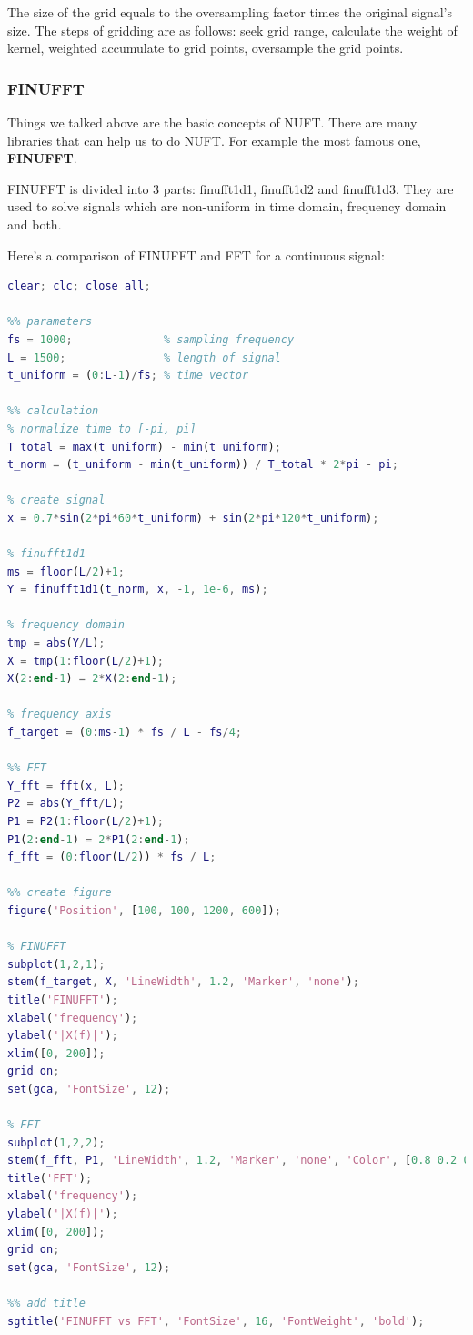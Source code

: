 \documentclass[12pt]{ctexart}
\begin{document}
The size of the grid equals to the oversampling factor times the original signal's size.
The steps of gridding are as follows: seek grid range, calculate the weight of kernel,
weighted accumulate to grid points, oversample the grid points.

\subsubsection{\textbf{FINUFFT}}

Things we talked above are the basic concepts of NUFT. There are many libraries
that can help us to do NUFT. For example the most famous one, \textbf{FINUFFT}.

FINUFFT is divided into 3 parts: finufft1d1, finufft1d2 and finufft1d3. They are
used to solve signals which are non-uniform in time domain, frequency domain and
both.

Here's a comparison of FINUFFT and FFT for a continuous signal:
\begin{lstlisting}[language=Matlab]
%% FINUFFT_example
clear; clc; close all;

%% parameters
fs = 1000;              % sampling frequency
L = 1500;               % length of signal
t_uniform = (0:L-1)/fs; % time vector

%% calculation
% normalize time to [-pi, pi]
T_total = max(t_uniform) - min(t_uniform);
t_norm = (t_uniform - min(t_uniform)) / T_total * 2*pi - pi;

% create signal
x = 0.7*sin(2*pi*60*t_uniform) + sin(2*pi*120*t_uniform);

% finufft1d1
ms = floor(L/2)+1;
Y = finufft1d1(t_norm, x, -1, 1e-6, ms);

% frequency domain
tmp = abs(Y/L);
X = tmp(1:floor(L/2)+1);
X(2:end-1) = 2*X(2:end-1);

% frequency axis
f_target = (0:ms-1) * fs / L - fs/4;

%% FFT
Y_fft = fft(x, L);
P2 = abs(Y_fft/L);
P1 = P2(1:floor(L/2)+1);
P1(2:end-1) = 2*P1(2:end-1);
f_fft = (0:floor(L/2)) * fs / L;

%% create figure
figure('Position', [100, 100, 1200, 600]);

% FINUFFT
subplot(1,2,1);
stem(f_target, X, 'LineWidth', 1.2, 'Marker', 'none');
title('FINUFFT');
xlabel('frequency');
ylabel('|X(f)|');
xlim([0, 200]);
grid on;
set(gca, 'FontSize', 12);

% FFT
subplot(1,2,2);
stem(f_fft, P1, 'LineWidth', 1.2, 'Marker', 'none', 'Color', [0.8 0.2 0.2]);
title('FFT');
xlabel('frequency');
ylabel('|X(f)|');
xlim([0, 200]);
grid on;
set(gca, 'FontSize', 12);

%% add title
sgtitle('FINUFFT vs FFT', 'FontSize', 16, 'FontWeight', 'bold');
\end{lstlisting}
\end{document}
